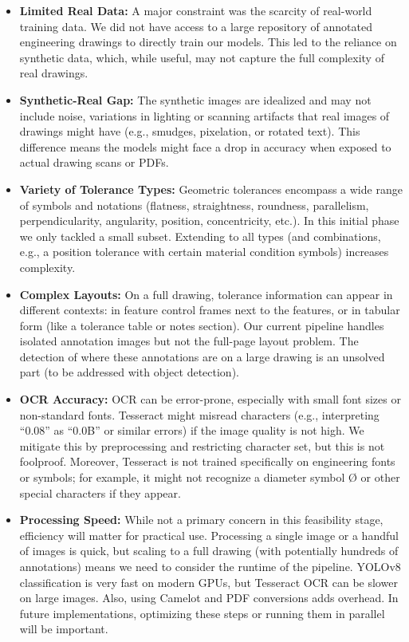 \documentclass[11pt,a4paper]{article}
\begin{document}
\begin{itemize}
  \item \textbf{Limited Real Data:} A major constraint was the scarcity of real-world training data. We did not have access to a large repository of annotated engineering drawings to directly train our models. This led to the reliance on synthetic data, which, while useful, may not capture the full complexity of real drawings.
  \item \textbf{Synthetic-Real Gap:} The synthetic images are idealized and may not include noise, variations in lighting or scanning artifacts that real images of drawings might have (e.g., smudges, pixelation, or rotated text). This difference means the models might face a drop in accuracy when exposed to actual drawing scans or PDFs.
  \item \textbf{Variety of Tolerance Types:} Geometric tolerances encompass a wide range of symbols and notations (flatness, straightness, roundness, parallelism, perpendicularity, angularity, position, concentricity, etc.). In this initial phase we only tackled a small subset. Extending to all types (and combinations, e.g., a position tolerance with certain material condition symbols) increases complexity.
  \item \textbf{Complex Layouts:} On a full drawing, tolerance information can appear in different contexts: in feature control frames next to the features, or in tabular form (like a tolerance table or notes section). Our current pipeline handles isolated annotation images but not the full-page layout problem. The detection of where these annotations are on a large drawing is an unsolved part (to be addressed with object detection).
  \item \textbf{OCR Accuracy:} OCR can be error-prone, especially with small font sizes or non-standard fonts. Tesseract might misread characters (e.g., interpreting “0.08” as “0.0B” or similar errors) if the image quality is not high. We mitigate this by preprocessing and restricting character set, but this is not foolproof. Moreover, Tesseract is not trained specifically on engineering fonts or symbols; for example, it might not recognize a diameter symbol Ø or other special characters if they appear.
  \item \textbf{Processing Speed:} While not a primary concern in this feasibility stage, efficiency will matter for practical use. Processing a single image or a handful of images is quick, but scaling to a full drawing (with potentially hundreds of annotations) means we need to consider the runtime of the pipeline. YOLOv8 classification is very fast on modern GPUs, but Tesseract OCR can be slower on large images. Also, using Camelot and PDF conversions adds overhead. In future implementations, optimizing these steps or running them in parallel will be important.

\end{itemize}
\end{document}
